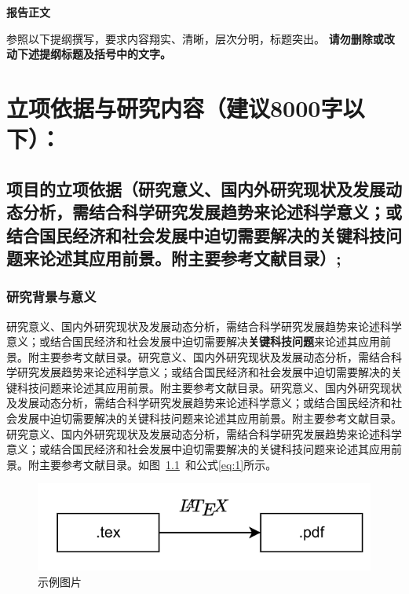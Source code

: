 \documentclass{nsfc}
\begin{document}
\begin{center}
    \Large\kaishu\textbf{报告正文}
\end{center}

\begin{onehalfspace}
    \large\kaishu
    参照以下提纲撰写，要求内容翔实、清晰，层次分明，标题突出。
    {\color{nsfc_blue}\textbf{请勿删除或改动下述提纲标题及括号中的文字。}}
\end{onehalfspace}

\chapter{立项依据与研究内容（建议8000字以下）：}

\section{\textbf{项目的立项依据}（研究意义、国内外研究现状及发展动态分析，需结合科学研究发展趋势来论述科学意义；或结合国民经济和社会发展中迫切需要解决的关键科技问题来论述其应用前景。附主要参考文献目录）;}

\subsection{研究背景与意义}

研究意义、国内外研究现状及发展动态分析，需结合科学研究发展趋势来论述科学意义；或结合国民经济和社会发展中迫切需要解决\textbf{关键科技问题}来论述其应用前景。附主要参考文献目录。研究意义、国内外研究现状及发展动态分析，需结合科学研究发展趋势来论述科学意义；或结合国民经济和社会发展中迫切需要解决的关键科技问题来论述其应用前景\cite{latex2e,latex:companion}。附主要参考文献目录。研究意义、国内外研究现状及发展动态分析，需结合科学研究发展趋势来论述科学意义；或结合国民经济和社会发展中迫切需要解决的关键科技问题来论述其应用前景\citet{latex:companion}。附主要参考文献目录。研究意义、国内外研究现状及发展动态分析，需结合科学研究发展趋势来论述科学意义\citet{lesk:1977,texbook}；或结合国民经济和社会发展中迫切需要解决的关键科技问题来论述其应用前景。附主要参考文献目录\cite{knuth:1984}。如图~\ref{fig:test}~和公式\eqref{eq:1}所示。

\begin{figure}[h]
    \centering
    \includegraphics[width=0.4\linewidth]{example_fig.png}
    \caption{示例图片}
    \label{fig:test}
\end{figure}
\end{document}
